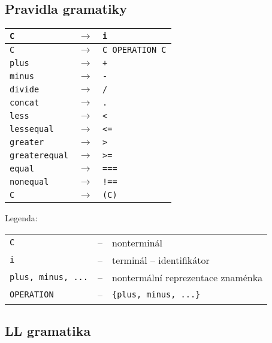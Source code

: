\documentclass[12pt,a4paper,titlepage,final]{article}
\begin{document}
    \newpage

    \subsection{Pravidla gramatiky}

    \begin{tabular}{ l r l }

      \hline
      \texttt{C} & $\rightarrow$ & \texttt{i} \\
      \hline
      \texttt{C} & $\rightarrow$ & \texttt{C OPERATION C} \\
      \hline
      \texttt{plus} & $\rightarrow$ & \texttt{+} \\
      \texttt{minus} & $\rightarrow$ & \texttt{-} \\
      \texttt{divide} & $\rightarrow$ & \texttt{/} \\
      \texttt{concat} & $\rightarrow$ & \texttt{.} \\
      \texttt{less} & $\rightarrow$ & \texttt{<} \\
      \texttt{lessequal} & $\rightarrow$ & \texttt{<=} \\
      \texttt{greater} & $\rightarrow$ & \texttt{>} \\
      \texttt{greaterequal} & $\rightarrow$ & \texttt{>=} \\
      \texttt{equal} & $\rightarrow$ & \texttt{===} \\
      \texttt{nonequal} & $\rightarrow$ & \texttt{!==} \\
      \hline
      \texttt{C} & $\rightarrow$ & \texttt{(C)} \\
      \hline

    \end{tabular}

    Legenda:

    \begin{tabular}{l l l}
      \texttt{C} & -- & nonterminál \\
      \texttt{i} & -- & terminál -- identifikátor \\
      \texttt{plus, minus, ...} & -- & nontermální reprezentace znaménka \\
      \texttt{OPERATION} & -- & \texttt{\{plus, minus, ...\}}\\
    \end{tabular}

    \subsection{LL gramatika}
\end{document}
